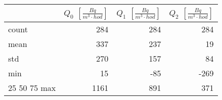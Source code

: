 \begin{tabular}{lrrr}
\toprule
{} &  $Q_0$ $\left[\si{\frac{Bq}{m^3\cdot hod}}\right]$ &  $Q_1$ $\left[\si{\frac{Bq}{m^3\cdot hod}}\right]$ &  $Q_2$ $\left[\si{\frac{Bq}{m^3\cdot hod}}\right]$ \\
\midrule
count &                                                284 &                                                284 &                                                284 \\
mean  &                                                337 &                                                237 &                                                 19 \\
std   &                                                270 &                                                157 &                                                 84 \\
min   &                                                 15 &                                                -85 &                                               -269 \\
25%
50%
75%
max   &                                               1161 &                                                891 &                                                371 \\
\bottomrule
\end{tabular}
